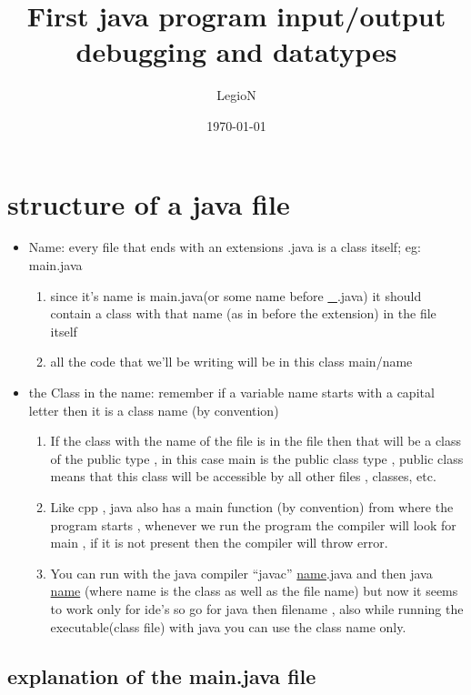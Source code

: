 \documentclass[11pt]{article}
\author{LegioN}
\date{\today}
\title{First java program input/output debugging and datatypes}
\begin{document}
\maketitle
\tableofcontents


\section{structure of a java file}
\label{sec:orgcf58717}

\begin{itemize}
\item Name: every file that ends with an extensions .java is a class itself; eg: main.java
\begin{enumerate}
\item since it's name is main.java(or some name before \uline{\_}.java) it should contain a class with that name (as in before the extension) in the file itself
\item all the code that we'll be writing will be in this class main/name
\end{enumerate}
\item the Class in the name: remember if a variable name starts with a capital letter then it is a class name (by convention)
\begin{enumerate}
\item If the class with the name of the file is in the file then that will be a class of the public type , in this case main is the public class type , public class means that this class will be accessible by all other files , classes, etc.
\item Like cpp , java also has a main function (by convention) from where the program starts , whenever we run the program the compiler will look for main , if it is not present then the compiler will throw error.
\item You can run with the java compiler ``javac'' \uline{name}.java and then java \uline{name} (where name is the class as well as the file name) but now it seems to work only for ide's so go for java then filename , also while running the executable(class file) with java you can use the class name only.
\end{enumerate}
\end{itemize}

\subsection{explanation of the main.java file}
\label{sec:orgb8b75a4}
\end{document}
